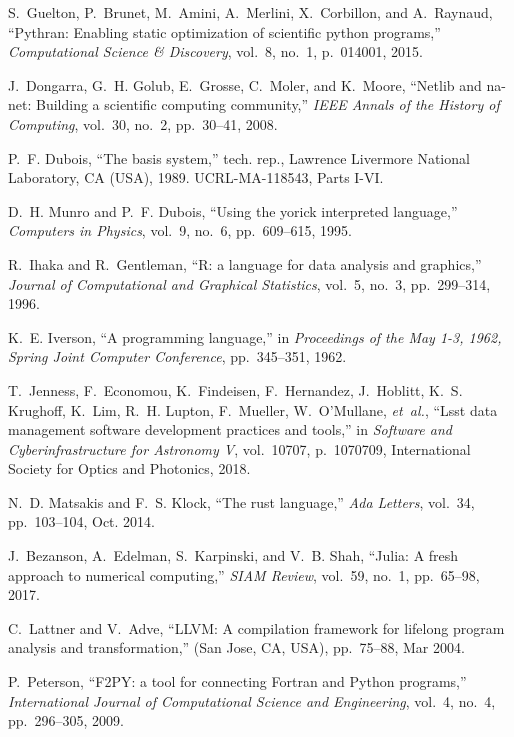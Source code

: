 \documentclass[twocolumn]{article}
\begin{document}
\begin{thebibliography}{10}
S.~Guelton, P.~Brunet, M.~Amini, A.~Merlini, X.~Corbillon, and A.~Raynaud,
  ``Pythran: Enabling static optimization of scientific python programs,'' {\em
  Computational Science \& Discovery}, vol.~8, no.~1, p.~014001, 2015.

J.~Dongarra, G.~H. Golub, E.~Grosse, C.~Moler, and K.~Moore, ``Netlib and
  na-net: Building a scientific computing community,'' {\em IEEE Annals of the
  History of Computing}, vol.~30, no.~2, pp.~30--41, 2008.

P.~F. Dubois, ``The basis system,'' tech. rep., Lawrence Livermore National
  Laboratory, CA (USA), 1989.
\newblock UCRL-MA-118543, Parts I-VI.

D.~H. Munro and P.~F. Dubois, ``Using the yorick interpreted language,'' {\em
  Computers in Physics}, vol.~9, no.~6, pp.~609--615, 1995.

R.~Ihaka and R.~Gentleman, ``R: a language for data analysis and graphics,''
  {\em Journal of Computational and Graphical Statistics}, vol.~5, no.~3,
  pp.~299--314, 1996.

K.~E. Iverson, ``A programming language,'' in {\em Proceedings of the May 1-3,
  1962, Spring Joint Computer Conference}, pp.~345--351, 1962.

T.~Jenness, F.~Economou, K.~Findeisen, F.~Hernandez, J.~Hoblitt, K.~S.
  Krughoff, K.~Lim, R.~H. Lupton, F.~Mueller, W.~O'Mullane, {\em et~al.},
  ``Lsst data management software development practices and tools,'' in {\em
  Software and Cyberinfrastructure for Astronomy V}, vol.~10707, p.~1070709,
  International Society for Optics and Photonics, 2018.

N.~D. Matsakis and F.~S. Klock, ``The rust language,'' {\em Ada Letters},
  vol.~34, pp.~103--104, Oct. 2014.

J.~Bezanson, A.~Edelman, S.~Karpinski, and V.~B. Shah, ``Julia: A fresh
  approach to numerical computing,'' {\em SIAM {R}eview}, vol.~59, no.~1,
  pp.~65--98, 2017.

C.~Lattner and V.~Adve, ``{LLVM}: A compilation framework for lifelong program
  analysis and transformation,'' (San Jose, CA, USA), pp.~75--88, Mar 2004.

P.~Peterson, ``{F2PY}: a tool for connecting {F}ortran and {P}ython programs,''
  {\em International Journal of Computational Science and Engineering}, vol.~4,
  no.~4, pp.~296--305, 2009.


\end{thebibliography}
\end{document}
